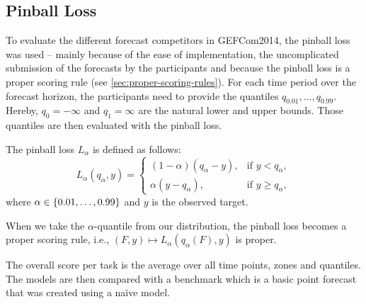 \subsection{Pinball Loss}
\label{sec:pinball-loss-explanation}

To evaluate the different forecast competitors in GEFCom2014, 
the pinball loss was used -- mainly because of the ease of implementation, 
the uncomplicated submission of the forecasts by the participants 
and because the pinball loss is a proper scoring rule (see \ref{sec:proper-scoring-rules}).
For each time period over the forecast horizon, the participants need to 
provide the quantiles \(q_{0.01}, \ldots, q_{0.99}\). 
Hereby, \(q_0 = -\infty\) and \(q_1 = \infty\) are the natural lower and upper bounds. 
Those quantiles are then evaluated with the pinball loss.

The pinball loss \(L_\alpha\) is defined as follows: 
\[ L_\alpha(q_\alpha, y) = \begin{cases}
    (1-\alpha)(q_\alpha - y), &\text{if } y < q_\alpha, \\
    \alpha(y - q_\alpha), &\text{if } y \geq q_\alpha,
\end{cases} \]
where \(\alpha \in \{0.01, \ldots, 0.99\}\) and \(y\) is the observed target.

When we take the \(\alpha\)-quantile from our distribution, the pinball loss becomes a proper scoring rule, i.e., \((F, y) \mapsto L_\alpha(q_\alpha(F), y)\) is proper. 

The overall score per task is the average over all time points, zones and quantiles.
The models are then compared with a benchmark which is a basic point forecast 
that was created using a na\"{i}ve model.